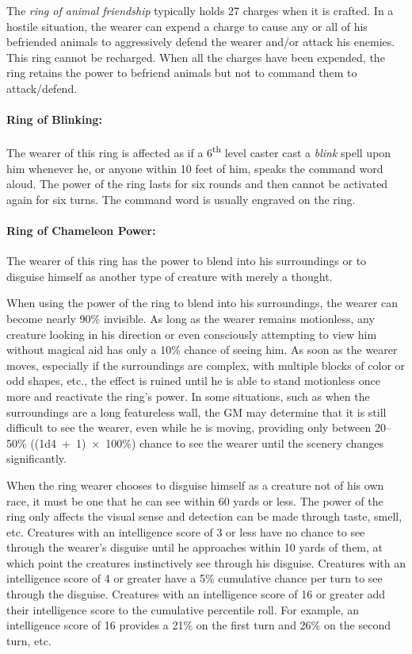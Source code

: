 \begin{multicols}{2}
The \textit{ring of animal friendship} typically holds 27 charges when it is crafted.  In a hostile situation, the wearer can expend a charge to cause any or all of his befriended animals to aggressively defend the wearer and/or attack his enemies.  This ring cannot be recharged.  When all the charges have been expended, the ring retains the power to befriend animals but not to command them to attack/defend.

\paragraph{Ring of Blinking:} The wearer of this ring is affected as if a 6\textsuperscript{th} level caster cast a \textit{blink} spell upon him whenever he, or anyone within 10 feet of him, speaks the command word aloud.  The power of the ring lasts for six rounds and then cannot be activated again for six turns.  The command word is usually engraved on the ring.  

\paragraph{Ring of Chameleon Power:} The wearer of this ring has the power to blend into his surroundings or to disguise himself as another type of creature with merely a thought.

When using the power of the ring to blend into his surroundings, the wearer can become nearly 90\% invisible.  As long as the wearer remains motionless, any creature looking in his direction or even consciously attempting to view him without magical aid has only a 10\% chance of seeing him.  As soon as the wearer moves, especially if the surroundings are complex, with multiple blocks of color or odd shapes, etc., the effect is ruined until he is able to stand motionless once more and reactivate the ring's power.  In some situations, such as when the surroundings are a long featureless wall, the GM may determine that it is still difficult to see the wearer, even while he is moving, providing only between 20--50\% ((1d4~+~1)~$\times$~100\%) chance to see the wearer until the scenery changes significantly. 

When the ring wearer chooses to disguise himself as a creature not of his own race, it must be one that he can see within 60 yards or less.  The power of the ring only affects the visual sense and detection can be made through taste, smell, etc.  Creatures with an intelligence score of 3 or less have no chance to see through the wearer's disguise until he approaches within 10 yards of them, at which point the creatures instinctively see through his disguise.  Creatures with an intelligence score of 4 or greater have a 5\% cumulative chance per turn to see through the disguise.  Creatures with an intelligence score of 16 or greater add their intelligence score to the cumulative percentile roll.  For example, an intelligence score of 16 provides a 21\% on the first turn and 26\% on the second turn, etc.


\end{multicols}
